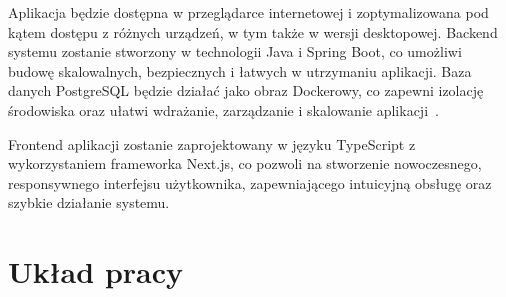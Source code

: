 Aplikacja będzie dostępna w przeglądarce internetowej i zoptymalizowana pod kątem dostępu z różnych urządzeń, w tym także w wersji desktopowej. Backend systemu zostanie stworzony w technologii Java i Spring Boot, co umożliwi budowę skalowalnych, bezpiecznych i łatwych w utrzymaniu aplikacji. Baza danych PostgreSQL będzie działać jako obraz Dockerowy, co zapewni izolację środowiska oraz ułatwi wdrażanie, zarządzanie i skalowanie aplikacji~\cite{EARTHLY}.

Frontend aplikacji zostanie zaprojektowany w języku TypeScript z wykorzystaniem frameworka Next.js, co pozwoli na stworzenie nowoczesnego, responsywnego interfejsu użytkownika, zapewniającego intuicyjną obsługę oraz szybkie działanie systemu.

\section{Układ pracy}
